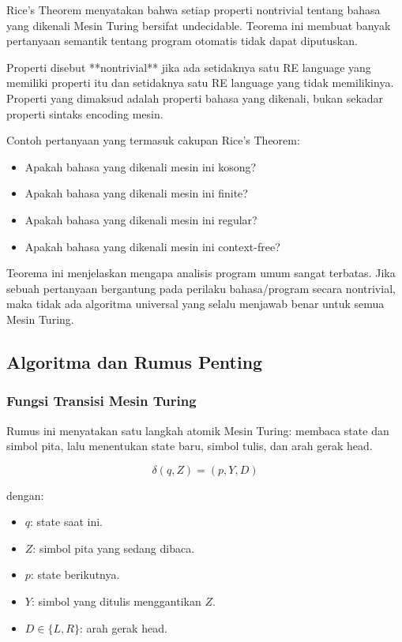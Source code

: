 \begin{jawab}
Rice's Theorem menyatakan bahwa setiap properti nontrivial tentang bahasa yang dikenali Mesin Turing bersifat undecidable. Teorema ini membuat banyak pertanyaan semantik tentang program otomatis tidak dapat diputuskan.
\end{jawab}

Properti disebut **nontrivial** jika ada setidaknya satu RE language yang memiliki properti itu dan setidaknya satu RE language yang tidak memilikinya. Properti yang dimaksud adalah properti bahasa yang dikenali, bukan sekadar properti sintaks encoding mesin.

Contoh pertanyaan yang termasuk cakupan Rice's Theorem:
\begin{itemize}
    \item Apakah bahasa yang dikenali mesin ini kosong?
    \item Apakah bahasa yang dikenali mesin ini finite?
    \item Apakah bahasa yang dikenali mesin ini regular?
    \item Apakah bahasa yang dikenali mesin ini context-free?
\end{itemize}

Teorema ini menjelaskan mengapa analisis program umum sangat terbatas. Jika sebuah pertanyaan bergantung pada perilaku bahasa/program secara nontrivial, maka tidak ada algoritma universal yang selalu menjawab benar untuk semua Mesin Turing.

\subsection{Algoritma dan Rumus Penting}

\subsubsection{Fungsi Transisi Mesin Turing}

\begin{jawab}
Rumus ini menyatakan satu langkah atomik Mesin Turing: membaca state dan simbol pita, lalu menentukan state baru, simbol tulis, dan arah gerak head.
\end{jawab}

\begin{equation}
    \delta(q,Z)=(p,Y,D)
    \label{eq:transisi-tm}
\end{equation}

dengan:
\begin{itemize}
    \item $q$: state saat ini.
    \item $Z$: simbol pita yang sedang dibaca.
    \item $p$: state berikutnya.
    \item $Y$: simbol yang ditulis menggantikan $Z$.
    \item $D\in\{L,R\}$: arah gerak head.
\end{itemize}

